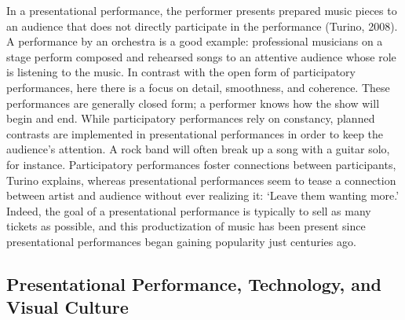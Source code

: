 In a presentational performance, the performer presents prepared music pieces to an audience that does not directly participate in the performance (Turino, 2008). A performance by an orchestra is a good example: professional musicians on a stage perform composed and rehearsed songs to an attentive audience whose role is listening to the music. In contrast with the open form of participatory performances, here there is a focus on detail, smoothness, and coherence. These performances are generally closed form; a performer knows how the show will begin and end. While participatory performances rely on constancy, planned contrasts are implemented in presentational performances in order to keep the audience's attention. A rock band will often break up a song with a guitar solo, for instance. Participatory performances foster connections between participants, Turino explains, whereas presentational performances seem to tease a connection between artist and audience without ever realizing it: `Leave them wanting more.' Indeed, the goal of a presentational performance is typically to sell as many tickets as possible, and this productization of music has been present since presentational performances began gaining popularity just centuries ago.

\subsection{Presentational Performance, Technology, and Visual Culture}

